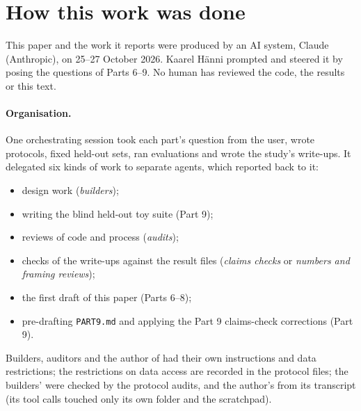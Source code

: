 \section{How this work was done}\label{app:provenance}

This paper and the work it reports were produced by an AI system, Claude (Anthropic), on 25--27 October 2026. Kaarel H\"anni prompted and steered it by posing the questions of Parts 6--9. No human has reviewed the code, the results or this text.

\paragraph{Organisation.} One orchestrating session took each part's question from the user, wrote protocols, fixed held-out sets, ran evaluations and wrote the study's write-ups. It delegated six kinds of work to separate agents, which reported back to it:
\begin{itemize}
\item design work (\emph{builders});
\item writing the blind held-out toy suite  (Part 9);
\item reviews of code and process (\emph{audits});
\item checks of the write-ups against the result files (\emph{claims checks} or \emph{numbers and framing reviews});
\item the first draft of this paper (Parts 6--8);
\item pre-drafting \texttt{PART9.md} and applying the Part 9 claims-check corrections (Part 9).
\end{itemize}
Builders, auditors and the author of  had their own instructions and data restrictions; the restrictions on data access are recorded in the protocol files; the builders' were checked by the protocol audits, and the  author's from its transcript (its tool calls touched only its own folder and the scratchpad).

